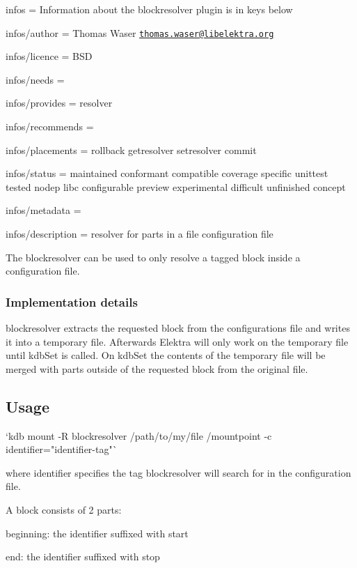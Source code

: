 
\begin{DoxyItemize}
\item infos = Information about the blockresolver plugin is in keys below
\item infos/author = Thomas Waser \href{mailto:thomas.waser@libelektra.org}{\tt thomas.\+waser@libelektra.\+org}
\item infos/licence = B\+SD
\item infos/needs =
\item infos/provides = resolver
\item infos/recommends =
\item infos/placements = rollback getresolver setresolver commit
\item infos/status = maintained conformant compatible coverage specific unittest tested nodep libc configurable preview experimental difficult unfinished concept
\item infos/metadata =
\item infos/description = resolver for parts in a file configuration file
\end{DoxyItemize}

The {\ttfamily blockresolver} can be used to only resolve a tagged block inside a configuration file.

\subsubsection*{Implementation details}

{\ttfamily blockresolver} extracts the requested block from the configurations file and writes it into a temporary file. Afterwards Elektra will only work on the temporary file until kdb\+Set is called. On kdb\+Set the contents of the temporary file will be merged with parts outside of the requested block from the original file.

\subsection*{Usage}

\begin{DoxyVerb}`kdb mount -R blockresolver /path/to/my/file /mountpoint -c identifier="identifier-tag"`
\end{DoxyVerb}


where {\ttfamily identifier} specifies the tag {\ttfamily blockresolver} will search for in the configuration file.

A block consists of 2 parts\+:
\begin{DoxyItemize}
\item beginning\+: the identifier suffixed with {\ttfamily start}
\item end\+: the identifier suffixed with {\ttfamily stop}
\end{DoxyItemize}

